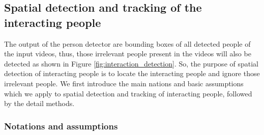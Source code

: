 \subsection{Spatial detection and tracking of the interacting people}
\label{locate_interacting_people}
The output of the person detector are bounding boxes of all detected people of the input videos, thus, those irrelevant people present in the videos will also be detected as shown in Figure \ref{fig:interaction_detection}.  So, the purpose of spatial detection of interacting people is to locate the interacting people and ignore those irrelevant people. We first introduce the main nations and basic assumptions which we apply to spatial detection and tracking of interacting people, followed by the detail methods. 

\subsubsection*{Notations and assumptions}
